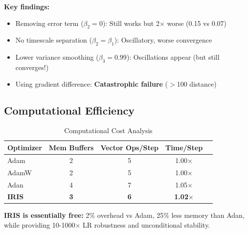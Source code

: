 \textbf{Key findings:}
\begin{itemize}
    \item Removing error term ($\beta_2=0$): Still works but 2$\times$ worse (0.15 vs 0.07)
    \item No timescale separation ($\beta_2 = \beta_1$): Oscillatory, worse convergence
    \item Lower variance smoothing ($\beta_3 = 0.99$): Oscillations appear (but still converges!)
    \item Using gradient difference: \textbf{Catastrophic failure} ($>$100 distance)
\end{itemize}

\subsection{Computational Efficiency}

\begin{table}[H]
\centering
\caption{Computational Cost Analysis}
\label{tab:compute_cost}
\begin{tabular}{@{}lcccc@{}}
\toprule
\textbf{Optimizer} & \textbf{Mem Buffers} & \textbf{Vector Ops/Step} & \textbf{Time/Step} \\
\midrule
Adam & 2 & 5 & 1.00$\times$ \\
AdamW & 2 & 5 & 1.00$\times$ \\
Adan & 4 & 7 & 1.05$\times$ \\
\textbf{IRIS} & \textbf{3} & \textbf{6} & \textbf{1.02$\times$} \\
\bottomrule
\end{tabular}
\end{table}

\textbf{IRIS is essentially free:} 2\% overhead vs Adam, 25\% less memory than Adan, while providing 10-1000$\times$ LR robustness and unconditional stability.
